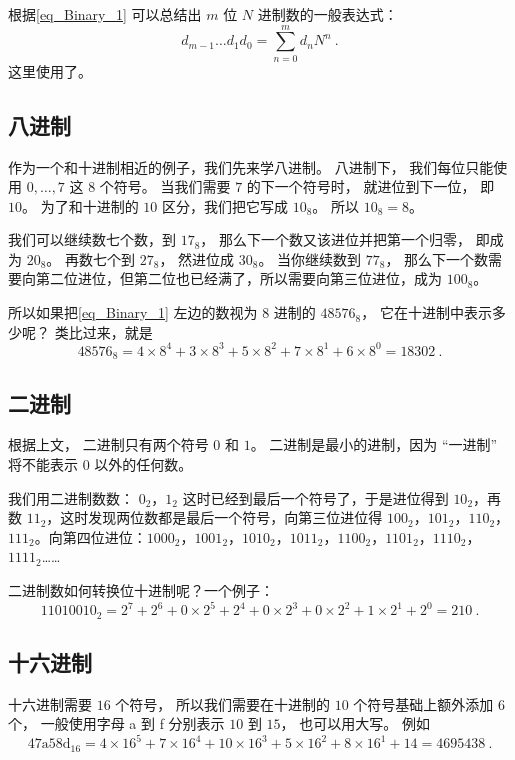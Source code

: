 根据\autoref{eq_Binary_1} 可以总结出 $m$ 位 $N$ 进制数的一般表达式：
\begin{equation}
d_{m-1}\dots d_1d_0 = \sum_{n=0}^m d_n N^n~.
\end{equation}
这里使用了。

\subsection{八进制}
作为一个和十进制相近的例子，我们先来学八进制。 八进制下， 我们每位只能使用 $0,\dots,7$ 这 $8$ 个符号。 当我们需要 $7$ 的下一个符号时， 就进位到下一位， 即 $10$。 为了和十进制的 $10$ 区分，我们把它写成 $10_\text{8}$。 所以 $10_\text{8} = 8$。

我们可以继续数七个数，到 $17_\text{8}$， 那么下一个数又该进位并把第一个归零， 即成为 $20_\text{8}$。 再数七个到 $27_\text{8}$， 然进位成 $30_\text{8}$。 当你继续数到 $77_\text{8}$， 那么下一个数需要向第二位进位，但第二位也已经满了，所以需要向第三位进位，成为 $100_\text{8}$。

所以如果把\autoref{eq_Binary_1} 左边的数视为 $8$ 进制的 $48576_\text{8}$， 它在十进制中表示多少呢？ 类比过来，就是
\begin{equation}
48576_\text{8} = 4\times 8^{4} + 3\times 8^{3} + 5\times 8^{2} + 7\times 8^1 + 6\times 8^0 = 18302~.
\end{equation}

\subsection{二进制}
根据上文， 二进制只有两个符号 $0$ 和 $1$。 二进制是最小的进制，因为 “一进制” 将不能表示 $0$ 以外的任何数。

我们用二进制数数： $0_\text{2}$，$1_\text{2}$ 这时已经到最后一个符号了，于是进位得到 $10_\text{2}$，再数 $11_\text{2}$，这时发现两位数都是最后一个符号，向第三位进位得 $100_\text{2}$，$101_\text{2}$，$110_\text{2}$，$111_\text{2}$。向第四位进位：$1000_\text{2}$，$1001_\text{2}$，$1010_\text{2}$，$1011_\text{2}$，$1100_\text{2}$，$1101_\text{2}$，$1110_\text{2}$，$1111_\text{2}$……

二进制数如何转换位十进制呢？一个例子：
\begin{equation}
11010010_\text{2} = 2^7 + 2^6 + 0\times 2^5 + 2^4 + 0\times 2^3 + 0 \times 2^2 + 1\times 2^1 + 2^0 = 210~.
\end{equation}


\subsection{十六进制}
十六进制需要 $16$ 个符号， 所以我们需要在十进制的 $10$ 个符号基础上额外添加 $6$ 个， 一般使用字母 a 到 f 分别表示 $10$ 到 $15$， 也可以用大写。 例如
\begin{equation}
\mathrm{47a58d}_\text{16} = 4\times 16^5 + 7\times 16^4 + 10\times 16^3 + 5\times 16^2 + 8 \times 16^1 + 14 = 4695438~.
\end{equation}

